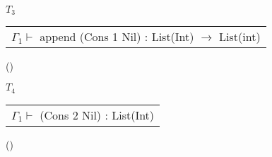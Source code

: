\documentclass[12pt, a4paper]{article}
\begin{document}
\begin{enumerate}[(a)]
	$T_3$
	\begin{tabular}{c}
		\\\hline
		$\Gamma_1 \vdash$ append (Cons 1 Nil) : List(Int) $\rightarrow$ List(int)
	\end{tabular}
	()

	$T_4$
	\begin{tabular}{c}
		\\\hline
		$\Gamma_1 \vdash$ (Cons 2 Nil) : List(Int)
	\end{tabular}
	()
\end{enumerate}

\section{} %
\end{document}
